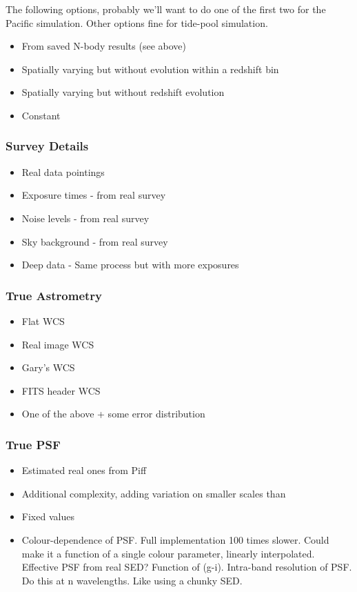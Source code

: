 \documentclass[\docopts]{\docclass}
\begin{document}
The following options, probably we'll want to do one of the first two for the Pacific simulation. Other options fine for tide-pool simulation. 
\begin{itemize}
\item From saved N-body results (see above)
\item Spatially varying but without evolution within a redshift bin
\item Spatially varying but without redshift evolution
\item Constant
\end{itemize}

\subsubsection{Survey Details}

\begin{itemize}
\item Real data pointings
\item Exposure times - from real survey
\item Noise levels - from real survey
\item Sky background - from real survey
\item Deep data - Same process but with more exposures
\end{itemize}


\subsubsection{True Astrometry}

\begin{itemize}
\item Flat WCS
\item Real image WCS
\item Gary's WCS
\item FITS header WCS
\item One of the above + some error distribution
\end{itemize}

\subsubsection{True PSF}

\begin{itemize}
\item Estimated real ones from Piff
\item Additional complexity, adding variation on smaller scales than 
\item Fixed values
\item Colour-dependence of PSF.
	  Full implementation 100 times slower.
	  Could make it a function of a single colour parameter, linearly interpolated.
	  Effective PSF from real SED? Function of (g-i).
	  Intra-band resolution of PSF.  Do this at n wavelengths.
	  Like using a chunky SED.
\end{itemize}
\end{document}
